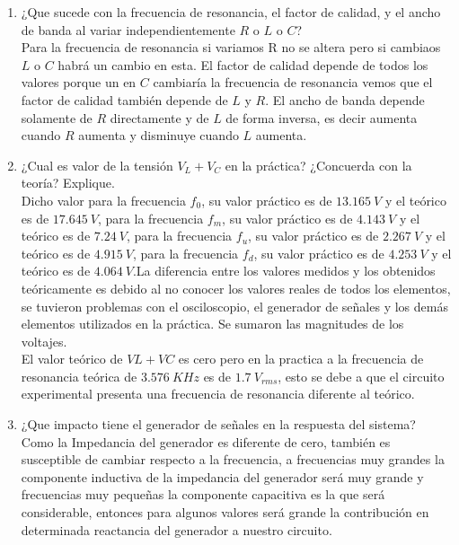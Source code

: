\documentclass[twocolumn]{IEEEtran}
\begin{document}
\begin{enumerate}
 \item ¿Que sucede con la frecuencia de resonancia, el factor de calidad, y el ancho de banda
al variar independientemente $R$ o $L$ o $C$?\\
Para la frecuencia de resonancia si variamos R no se altera pero si cambiaos $L$ o $C$ habrá un cambio en esta. El factor de calidad depende de todos los valores porque un en $C$ cambiaría la frecuencia de resonancia vemos que el factor de calidad también depende de $L$ y $R$. El ancho de banda depende solamente de $R$ directamente y de $L$ de forma inversa, es decir aumenta cuando $R$ aumenta y disminuye cuando $L$ aumenta.

 \item ¿Cual es valor de la tensión $V_L + V_C$ en la práctica? ¿Concuerda con la teoría? Explique.\\
Dicho valor para la frecuencia $f_0$, su valor práctico es de  $13.165\ V$ y el teórico es de $17.645\ V$, para la frecuencia $f_m$, su valor práctico es de $4.143\ V$ y el teórico es de $7.24\ V$, para la frecuencia $f_u$, su valor práctico es de $2.267\ V$ y el teórico es de $4.915\ V$,  para la frecuencia $f_d$, su valor práctico es de $4.253\ V$ y el teórico es de $4.064\ V$.La diferencia entre los valores medidos y los obtenidos teóricamente es debido al no conocer los valores reales de todos los elementos, se tuvieron problemas con el osciloscopio, el generador de señales y los demás elementos utilizados en la práctica. Se sumaron las magnitudes de los voltajes.\\
El valor teórico de $VL+VC$ es cero pero en la practica a la frecuencia de resonancia teórica de
$3.576\ KHz$ es de $1.7\ V_{rms}$, esto se debe a que el circuito experimental presenta una frecuencia
de resonancia diferente al teórico.

 \item ¿Que impacto tiene el generador de señales en la respuesta del sistema?\\
Como la Impedancia del generador es diferente de cero, también es susceptible de cambiar respecto a la frecuencia, a frecuencias muy grandes la componente inductiva  de la impedancia del generador será muy grande y frecuencias muy pequeñas la componente capacitiva es la que será considerable, entonces para algunos valores será grande la contribución en  determinada reactancia del generador a nuestro circuito.
\end{enumerate}
\end{document}
